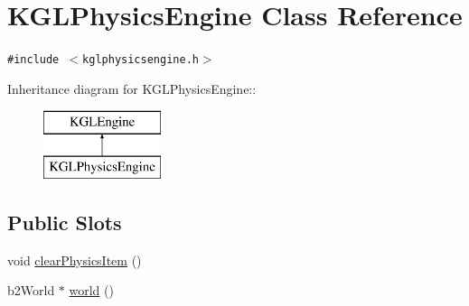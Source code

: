 \hypertarget{class_k_g_l_physics_engine}{
\section{KGLPhysicsEngine Class Reference}
\label{class_k_g_l_physics_engine}
}
{\tt \#include $<$kglphysicsengine.h$>$}

Inheritance diagram for KGLPhysicsEngine::\begin{figure}[H]
\begin{center}
\leavevmode
\includegraphics[height=2cm]{class_k_g_l_physics_engine}
\end{center}
\end{figure}
\subsection*{Public Slots}
\begin{CompactItemize}
\item 
void \hyperlink{class_k_g_l_physics_engine_6ec2dab4d2361f4904c7ca538efbe292}{clearPhysicsItem} ()
\item 
b2World $\ast$ \hyperlink{class_k_g_l_physics_engine_099fcf17ad1ecb1400e794c56705966a}{world} ()
\end{CompactItemize}
